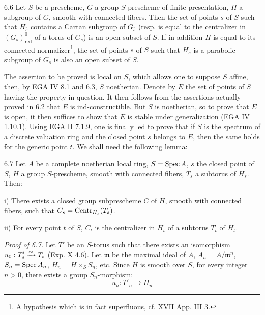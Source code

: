 \begin{lemma}{6.6}\label{XV.6.6}
Let $S$ be a prescheme, $G$ a group $S$-prescheme of finite presentation, $H$ a subgroup of $G$, smooth with connected fibers. Then the set of points $s$ of $S$ such that $H_{\bar s}$ contains a Cartan subgroup of $G_{\bar s}$ (resp. is equal to the centralizer in $(G_{\bar s})^0_{\mathrm{red}}$ of a torus of $G_{\bar s}$) is an open subset of $S$. If in addition $H$ is equal to its connected normalizer{\renewcommand{\thefootnote}{*}\footnote{A hypothesis which is in fact superfluous, cf. XVII App. III 3.}}\setcounter{footnote}{6}, the set of points $s$ of $S$ such that $H_s$ is a parabolic subgroup of $G_s$ is also an open subset of $S$.
\end{lemma}
The assertion to be proved is local on $S$, which allows one to suppose $S$ affine, then, by EGA IV 8.1 and 6.3, $S$ noetherian. Denote by $E$ the set of points of $S$ having the property in question. It then follows from the assertions actually proved in 6.2 that $E$ is ind-constructible. But $S$ is noetherian, so to prove that $E$ is open, it then suffices to show that $E$ is stable under generalization (EGA IV 1.10.1). Using EGA II 7.1.9, one is finally led to prove that if $S$ is the spectrum of a discrete valuation ring and the closed point $s$ belongs to $E$, then the same holds for the generic point $t$. We shall need the following lemma:
\begin{lemma}{6.7}\label{XV.6.7}
Let $A$ be a complete noetherian local ring, $S=\operatorname{Spec} A$, $s$ the closed point of $S$, $H$ a group $S$-prescheme, smooth with connected fibers, $T_s$ a subtorus of $H_s$. Then:

\noindent i) There exists a closed group subprescheme $C$ of $H$, smooth with connected fibers, such that $C_s=\operatorname{Centr}_{H_s}(T_s)$.

\noindent ii) For every point $t$ of $S$, $C_t$ is the centralizer in $H_t$ of a subtorus $T_t$ of $H_t$.
\end{lemma}
\par\noindent\emph{Proof of 6.7.}
Let $T'$ be an $S$-torus such that there exists an isomorphism $u_0:T'_s\xrightarrow{\sim} T_s$ (Exp. X 4.6). Let $\mathfrak m$ be the maximal ideal of $A$, $A_n=A/\mathfrak m^n$, $S_n=\operatorname{Spec} A_n$, $H_n=H\times_S S_n$, etc. Since $H$ is smooth over $S$, for every integer $n>0$, there exists a group $S_n$-morphism:
\[
u_n:T'_n\to H_n
\]
